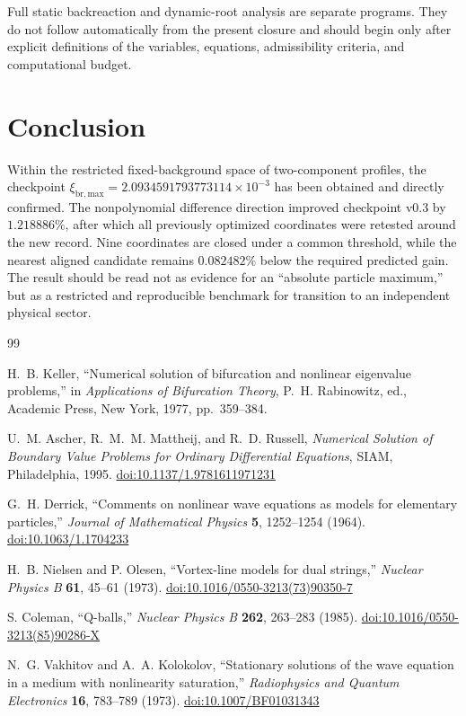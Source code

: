 \documentclass[11pt,a4paper]{article}
\newcommand{\xibr}{\xi_{\mathrm{br,max}}}
\begin{document}
Full static backreaction and dynamic-root analysis are separate programs. They do not follow automatically from the present closure and should begin only after explicit definitions of the variables, equations, admissibility criteria, and computational budget.

\section{Conclusion}

\enlargethispage{2\baselineskip}

Within the restricted fixed-background space of two-component profiles, the checkpoint $\xibr=2.0934591793773114\times10^{-3}$ has been obtained and directly confirmed. The nonpolynomial difference direction improved checkpoint v0.3 by $1.218886\%$, after which all previously optimized coordinates were retested around the new record. Nine coordinates are closed under a common threshold, while the nearest aligned candidate remains $0.082482\%$ below the required predicted gain. The result should be read not as evidence for an ``absolute particle maximum,'' but as a restricted and reproducible benchmark for transition to an independent physical sector.

\begin{thebibliography}{99}

H.~B. Keller,
``Numerical solution of bifurcation and nonlinear eigenvalue problems,''
in \textit{Applications of Bifurcation Theory}, P.~H. Rabinowitz, ed.,
Academic Press, New York, 1977, pp.~359--384.

U.~M. Ascher, R.~M.~M. Mattheij, and R.~D. Russell,
\textit{Numerical Solution of Boundary Value Problems for Ordinary Differential Equations},
SIAM, Philadelphia, 1995.
\href{https://doi.org/10.1137/1.9781611971231}{doi:10.1137/1.9781611971231}

G.~H. Derrick,
``Comments on nonlinear wave equations as models for elementary particles,''
\textit{Journal of Mathematical Physics} \textbf{5}, 1252--1254 (1964).
\href{https://doi.org/10.1063/1.1704233}{doi:10.1063/1.1704233}

H.~B. Nielsen and P. Olesen,
``Vortex-line models for dual strings,''
\textit{Nuclear Physics B} \textbf{61}, 45--61 (1973).
\href{https://doi.org/10.1016/0550-3213(73)90350-7}{doi:10.1016/0550-3213(73)90350-7}

S. Coleman,
``Q-balls,''
\textit{Nuclear Physics B} \textbf{262}, 263--283 (1985).
\href{https://doi.org/10.1016/0550-3213(85)90286-X}{doi:10.1016/0550-3213(85)90286-X}

N.~G. Vakhitov and A.~A. Kolokolov,
``Stationary solutions of the wave equation in a medium with nonlinearity saturation,''
\textit{Radiophysics and Quantum Electronics} \textbf{16}, 783--789 (1973).
\href{https://doi.org/10.1007/BF01031343}{doi:10.1007/BF01031343}

\end{thebibliography}
\end{document}
